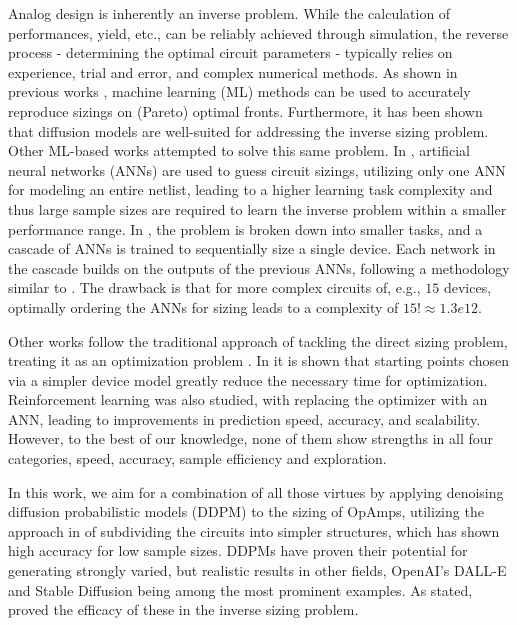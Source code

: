 \documentclass[conference]{IEEEtran}
\begin{document}
	Analog design is inherently an inverse problem. While the calculation of performances, yield, etc., can be reliably achieved through simulation, the reverse process - determining the optimal circuit parameters - typically relies on experience, trial and error, and complex numerical methods. As shown in previous works \cite{ leibl24inverse, lourenco19pareto}, machine learning (ML) methods can be used to accurately reproduce sizings on (Pareto) optimal fronts. Furthermore, it has been shown \cite{eid24diffusion} that diffusion models are well-suited for addressing the inverse sizing problem. Other ML-based works attempted to solve this same problem. In \cite{lourenco18}, artificial neural networks (ANNs) are used to guess circuit sizings, utilizing only one ANN for modeling an entire netlist, leading to a higher learning task complexity and thus large sample sizes are required to learn the inverse problem within a smaller performance range. In \cite{beaulieu23cascaded}, the problem is broken down into smaller tasks, and a cascade of ANNs is trained to sequentially size a single device. Each network in the cascade builds on the outputs of the previous ANNs, following a methodology similar to \cite{leibl24inverse}. The drawback is that for more complex circuits of, e.g., $15$ devices, optimally ordering the ANNs for sizing leads to a complexity of $15!\approx1.3e12$.
	
	Other works follow the traditional approach of tackling the direct sizing problem, treating it as an optimization problem \cite{fayazi23angel, budak23apostle, wolfe03nnmodel, hakhamaneshi23pretraining}. In \cite{leibl24initial} it is shown that starting points chosen via a simpler device model greatly reduce the necessary time for optimization. Reinforcement learning was also studied, with \cite{settaluri22reinforcement, zhang23multiagentRL}  replacing the optimizer with an ANN, leading to improvements in prediction speed, accuracy, and scalability. 
	However, to the best of our knowledge, none of them show strengths in all four categories, speed, accuracy, sample efficiency and exploration.
	
	In this work, we aim for a combination of all those virtues by applying denoising diffusion probabilistic models (DDPM) to the sizing of OpAmps, utilizing the approach in \cite{leibl24inverse} of subdividing the circuits into simpler structures, which has shown high accuracy for low sample sizes. DDPMs have proven their potential for generating strongly varied, but realistic results in other fields, OpenAI's DALL-E and Stable Diffusion being among the most prominent examples. As stated, \cite{eid24diffusion} proved the efficacy of these in the inverse sizing problem.
	
\end{document}
